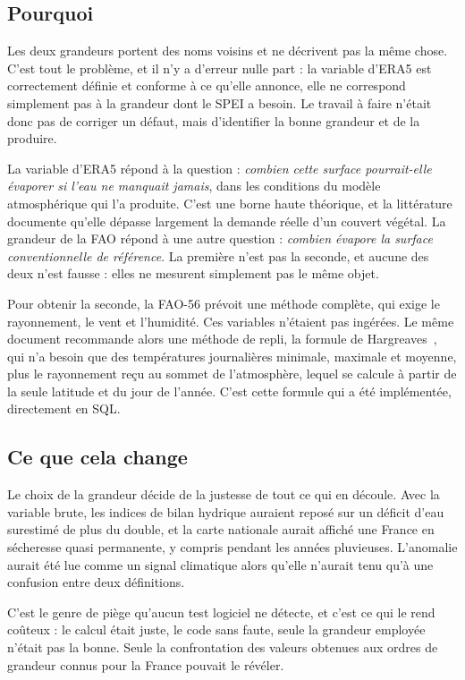 \subsection{Pourquoi}

Les deux grandeurs portent des noms voisins et ne décrivent pas la même chose. C'est tout le
problème, et il n'y a d'erreur nulle part : la variable d'ERA5 est correctement définie et
conforme à ce qu'elle annonce, elle ne correspond simplement pas à la grandeur dont le SPEI a
besoin. Le travail à faire n'était donc pas de corriger un défaut, mais d'identifier la bonne
grandeur et de la produire.

La variable d'ERA5 répond à la question : \emph{combien cette surface pourrait-elle évaporer si
l'eau ne manquait jamais}, dans les conditions du modèle atmosphérique qui l'a produite. C'est
une borne haute théorique, et la littérature documente qu'elle dépasse largement la demande
réelle d'un couvert végétal. La grandeur de la FAO répond à une autre question : \emph{combien
évapore la surface conventionnelle de référence}. La première n'est pas la seconde, et aucune
des deux n'est fausse : elles ne mesurent simplement pas le même objet.

Pour obtenir la seconde, la FAO-56 prévoit une méthode complète, qui exige le rayonnement, le
vent et l'humidité. Ces variables n'étaient pas ingérées. Le même document recommande alors une
méthode de repli, la formule de Hargreaves~\cite{hargreaves1985}, qui n'a besoin que des
températures journalières minimale, maximale et moyenne, plus le rayonnement reçu au sommet de
l'atmosphère, lequel se calcule à partir de la seule latitude et du jour de l'année. C'est cette
formule qui a été implémentée, directement en SQL.

\subsection{Ce que cela change}

Le choix de la grandeur décide de la justesse de tout ce qui en découle. Avec la variable brute,
les indices de bilan hydrique auraient reposé sur un déficit d'eau surestimé de plus du double,
et la carte nationale aurait affiché une France en sécheresse quasi permanente, y compris
pendant les années pluvieuses. L'anomalie aurait été lue comme un signal climatique alors
qu'elle n'aurait tenu qu'à une confusion entre deux définitions.

C'est le genre de piège qu'aucun test logiciel ne détecte, et c'est ce qui le rend coûteux : le
calcul était juste, le code sans faute, seule la grandeur employée n'était pas la bonne. Seule
la confrontation des valeurs obtenues aux ordres de grandeur connus pour la France pouvait le
révéler.

